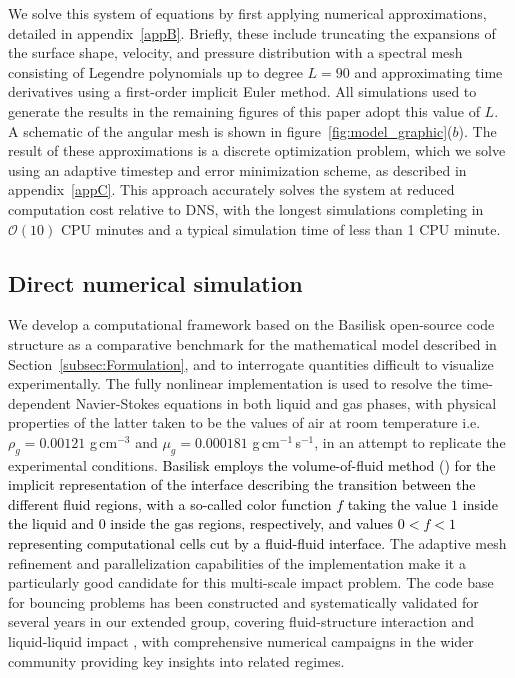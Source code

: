 \documentclass{jfm}
\newcommand{\edit}[1]{\textcolor{black}{#1}}
\begin{document}
We solve this system of equations by first applying numerical approximations, detailed in appendix~\ref{appB}. Briefly, these include truncating the expansions of the surface shape, velocity, and pressure distribution with a spectral mesh consisting of Legendre polynomials up to degree $L=90$ and approximating time derivatives using a first-order implicit Euler method. All simulations used to generate the results in the remaining figures of this paper adopt this value of $L$. A schematic of the angular mesh is shown in figure~\ref{fig:model_graphic}($b$). The result of these approximations is a discrete optimization problem, which we solve using an adaptive timestep and error minimization scheme, as described in appendix~\ref{appC}. This approach accurately solves the system at reduced computation cost relative to DNS, with the longest simulations completing in $\mathcal{O}(10)$ CPU minutes and a typical simulation time of less than 1 CPU minute.

\subsection{Direct numerical simulation} \label{subsec:dns}

We develop a computational framework based on the Basilisk open-source code structure \citep{popinet2009accurate,popinet2015quadtree} as a comparative benchmark for the mathematical model described in Section~\ref{subsec:Formulation}, and to interrogate quantities difficult to visualize experimentally. The fully nonlinear implementation is used to resolve the time-dependent Navier-Stokes equations in both liquid and gas phases, with physical properties of the latter taken to be the values of air at room temperature i.e. $\rho_g = 0.00121$ g$ \, $cm$^{-3}$ and $\mu_g = 0.000181$ g$ \, $cm$^{-1}$$ \, $s$^{-1}$, in an attempt to replicate the experimental conditions. \edit{Basilisk employs the volume-of-fluid method (\cite{hirt1981volume, scardovelli1999direct}) for the implicit representation of the interface describing the transition between the different fluid regions, with a so-called color function $f$ taking the value $1$ inside the liquid and $0$ inside the gas regions, respectively, and values $0 < f < 1$ representing computational cells cut by a fluid-fluid interface.} The adaptive mesh refinement and parallelization capabilities of the implementation make it a particularly good candidate for this multi-scale impact problem. The code base for bouncing problems has been constructed and systematically validated for several years in our extended group, covering fluid-structure interaction \citep{galeano2021capillary} and liquid-liquid impact \citep{alventosa2023inertio}, with comprehensive numerical campaigns in the wider community \citep{sanjay2023does,sanjay2023drop} providing key insights into related regimes.
\end{document}
